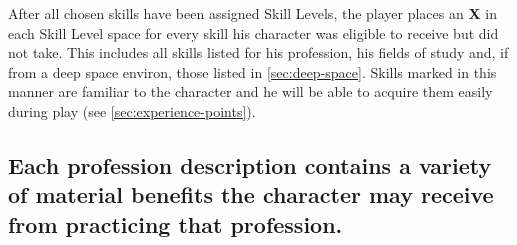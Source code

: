 After all chosen skills have been assigned Skill Levels, the player
places an \textbf{\textsf{X}} in each Skill Level space for every
skill his character was eligible to receive but did not take. This
includes all skills listed for his profession, his fields of study
and, if from a deep space environ, those listed in
\ref{sec:deep-space}. Skills marked in this manner are familiar to the
character and he will be able to acquire them easily during play (see
\ref{sec:experience-points}).

\begin{table}[htbp]
  \centering
\end{table}

\subsection[Benefits]{Each profession description contains a variety of
  material benefits the character may receive from  practicing that
  profession.}
\label{sec:benefits}

